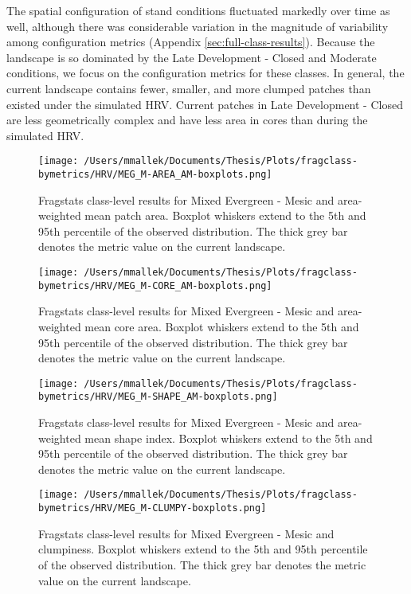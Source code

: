 The spatial configuration of stand conditions fluctuated markedly over time as well, although there was considerable variation in the magnitude of variability among configuration metrics (Appendix \ref{sec:full-class-results}). Because the landscape is so dominated by the Late Development - Closed and Moderate conditions, we focus on the configuration metrics for these classes. In general, the current landscape contains fewer, smaller, and more clumped patches than existed under the simulated HRV. Current patches in Late Development - Closed are less geometrically complex and have less area in cores than during the simulated HRV.


\begin{figure}[!htbp]
\centering
    \texttt{[image: /Users/mmallek/Documents/Thesis/Plots/fragclass-bymetrics/HRV/MEG\_M-AREA\_AM-boxplots.png]}
  \caption{Fragstats class-level results for Mixed Evergreen - Mesic and area-weighted mean patch area. Boxplot whiskers extend to the 5th and 95th percentile of the observed distribution. The thick grey bar denotes the metric value on the current landscape.}
  \label{fig:megm_areaam}
\end{figure}


\begin{figure}[!htbp]
\centering
    \texttt{[image: /Users/mmallek/Documents/Thesis/Plots/fragclass-bymetrics/HRV/MEG\_M-CORE\_AM-boxplots.png]}
  \caption{Fragstats class-level results for Mixed Evergreen - Mesic and area-weighted mean core area. Boxplot whiskers extend to the 5th and 95th percentile of the observed distribution. The thick grey bar denotes the metric value on the current landscape.}
  \label{fig:megm_coream}
\end{figure}


\begin{figure}[!htbp]
\centering
    \texttt{[image: /Users/mmallek/Documents/Thesis/Plots/fragclass-bymetrics/HRV/MEG\_M-SHAPE\_AM-boxplots.png]}
  \caption{Fragstats class-level results for Mixed Evergreen - Mesic and area-weighted mean shape index. Boxplot whiskers extend to the 5th and 95th percentile of the observed distribution. The thick grey bar denotes the metric value on the current landscape.}
  \label{fig:megm_shapeam}
\end{figure}


\begin{figure}[!htbp]
\centering
    \texttt{[image: /Users/mmallek/Documents/Thesis/Plots/fragclass-bymetrics/HRV/MEG\_M-CLUMPY-boxplots.png]}
  \caption{Fragstats class-level results for Mixed Evergreen - Mesic and clumpiness. Boxplot whiskers extend to the 5th and 95th percentile of the observed distribution. The thick grey bar denotes the metric value on the current landscape.}
  \label{fig:megm_clumpy}
\end{figure}

